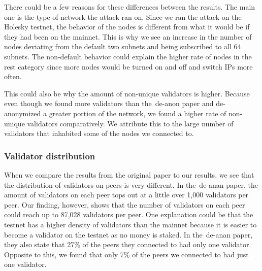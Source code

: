 There could be a few reasons for these differences between the results.
The main one is the type of network the attack ran on.
Since we ran the attack on the Holesky testnet, the behavior of the nodes is different from what it would be if they had been on the mainnet.
This is why we see an increase in the number of nodes deviating from the default two subnets and being subscribed to all 64 subnets.
The non-default behavior could explain the higher rate of nodes in the rest category since more nodes would be turned on and off and switch IPs more often.


This could also be why the amount of non-unique validators is higher.
Because even though we found more validators than the~\gls{de-anon paper} and de-anonymized a greater portion of the network, we found a higher rate of non-unique validators comparatively.
We attribute this to the large number of validators that inhabited some of the nodes we connected to.



\subsubsection{Validator distribution}\label{subsubsec:validator-distribution}
When we compare the results from the original paper to our results, we see that the distribution of validators on peers is very different.
In the~\gls{de-anan paper}, the amount of validators on each peer tops out at a little over 1,000 validators per peer.
Our finding, however, shows that the number of validators on each peer could reach up to 87,028 validators per peer.
One explanation could be that the testnet has a higher density of validators than the mainnet because it is easier to become a validator on the testnet as no money is staked.
In the~\gls{de-anan paper}, they also state that 27\% of the peers they connected to had only one validator.
Opposite to this, we found that only 7\% of the peers we connected to had just one validator.
